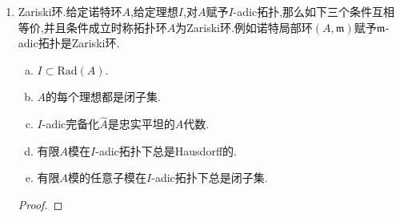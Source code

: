 \begin{enumerate}
\begin{enumerate}[(1)]
\begin{proof}
    		记$B=A[X_1,X_2,\cdots,X_n]$,记$I'=(X_1,X_2,\cdots,X_n)$,记$J=(X_1-a_1,X_2-a_2,\cdots,X_n-a_n)$,那么$B/J\cong A$.那么$A$关于$I$的完备化也就是$B/J$关于$I'$的完备化.于是上一引理说明$\widehat{A}=\widehat{B}/\widehat{JB}=\widehat{B}/J\widehat{B}=A[[X_1,X_2,\cdots,X_n]]/(X_1-a_1,X_2-a_2,\cdots,X_n-a_n)$.
    	\end{proof}
        \item 设$(A,\mathfrak{m})$是诺特局部环,那么$A$的$\mathfrak{m}$-adic完备化$\widehat{A}$也是诺特局部环,它的极大理想是$\mathfrak{m}\widehat{A}$,并且$\widehat{A}$与$A$有相同的剩余类域.更一般的,对任意$n\ge1$总有$\widehat{A}/\mathfrak{m}^n\widehat{A}\cong A/\mathfrak{m}^n$.
        \begin{proof}
        	
        	先证明$\widehat{A}/m^n\widehat{A}\cong A/m^n$.考虑短正合列$0\to m^n\to A\to A/m^n\to0$,诺特条件说明它们都是有限$A$模,于是$m$-adic完备化后保正合性,得到短正合列$0\to\widehat{(m^n)}\to\widehat{A}\to\widehat{(A/m^n)}\to0$.其中我们证明过$\widehat{(m^n)}=m^n\widehat{A}$.另外$A/m^n$是离散拓扑,它本身已经完备,于是$\widehat{A}/m^n\widehat{A}\cong\widehat{(A/m^n)}\cong\widehat{A/m^n}$.
        	
        	上面同构式取$n=1$,说明$m\widehat{A}$是$\widehat{A}$的极大理想.我们已经证明过诺特环关于任意真理想的完备化还是诺特的.最后我们来说明$m\widehat{A}$是$\widehat{A}$唯一的极大理想.任取$a\in\widehat{A}-m\widehat{A}$,仅需验证$a$是$\widehat{A}$中可逆元.按照$\widehat{A}/m\widehat{A}\cong A/m$,存在$a_0\in A$和$b\in m\widehat{A}$使得$a=a_0+b$(这里$A$视为$\widehat{A}$的子环),按照$a$和$a_0$在$\widehat{A}/m\widehat{A}\cong A/mA$中有相同的像,说明$a_0$是$A$中可逆元,于是$a_0$也是$\widehat{A}$中可逆元.而$b\in m\widehat{A}$,说明$b^n$极限为零,于是$a=a_0+b$是可逆元.(这是因为,归结为$a_0=1$的情况,此时$1-b+b^2-b^3+\cdots$是柯西列,它收敛,并且是$1+b$的逆元).
        \end{proof}
    \end{enumerate}
    \item Zariski环.给定诺特环$A$,给定理想$I$,对$A$赋予$I$-adic拓扑,那么如下三个条件互相等价,并且条件成立时称拓扑环$A$为Zariski环.例如诺特局部环$(A,\mathfrak{m})$赋予$\mathfrak{m}$-adic拓扑是Zariski环.
    \begin{enumerate}[(a)]
    	\item $I\subset\mathrm{Rad}(A)$.
    	\item $A$的每个理想都是闭子集.
    	\item $I$-adic完备化$\widehat{A}$是忠实平坦的$A$代数.
    	\item 有限$A$模在$I$-adic拓扑下总是Hausdorff的.
    	\item 有限$A$模的任意子模在$I$-adic拓扑下总是闭子集.
    \end{enumerate}
    \begin{proof}
    	

\end{proof}
\end{enumerate}
